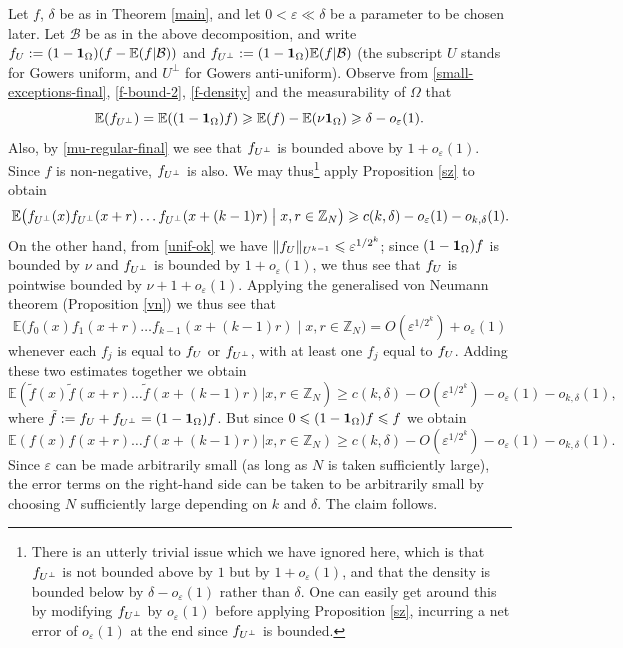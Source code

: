 \documentclass[12pt,a4paper,reqno]{amsart}
\numberwithin{equation}{section}
\theoremstyle{plain}
\theoremstyle{definition}
\renewcommand{\leq}{\leqslant}
\renewcommand{\geq}{\geqslant}
\def\funif{\ensuremath f_{U}}
\def\fanti{\ensuremath f_{U^\perp}}
\def\B{{\mathcal B}}
\def\E{{\mathbb E}}
\def\eps{{\varepsilon}}
\def\ni{\noindent}
\def\endproof{\hfill{\usebox{\proofbox}}}
\def\emph#1{{\it #1}}
\begin{document}
\ni\emph{Proof of Theorem \ref{main} assuming Proposition \ref{kvn-decomp}.}  Let $f$, $\delta$ be as in Theorem \ref{main}, and let $0 < \eps \ll \delta$ be a parameter to be chosen later.  Let $\B$ be as in the above decomposition, and write $\funif := (1-{\bf 1}_\Omega)(f-\E(f|\B))$ and
$\fanti := (1-{\bf 1}_\Omega)\E(f|\B)$ (the subscript $U$ stands for Gowers uniform, and $U^\perp$ for Gowers anti-uniform).  Observe from \eqref{small-exceptions-final}, \eqref{f-bound-2},
\eqref{f-density} and the measurability of $\Omega$ that
$$ \E( \fanti ) = \E( (1-{\bf 1}_\Omega) f) \geq \E(f) - \E( \nu {\bf 1}_\Omega ) \geq \delta - o_\eps(1).$$
Also, by \eqref{mu-regular-final} we see that $\fanti$ is bounded above by $1+o_{\eps}(1)$.  Since $f$ is non-negative, $\fanti$ is also.
We may thus\footnote{There is an utterly trivial issue which we have ignored here, which is that $\fanti$ is not bounded above by $1$ but by $1 + o_\eps(1)$, and that the density is bounded below by $\delta - o_\eps(1)$ rather than $\delta$. One can easily get around this by modifying $\fanti$ by $o_\eps(1)$ before applying Proposition \ref{sz}, incurring a net error of $o_\eps(1)$ at the end since $\fanti$ is bounded.} apply Proposition \ref{sz}  to obtain
\[
 \E\big( \fanti(x) \fanti(x+r) \ldots \fanti(x+(k-1)r) \; \big| \; x,r \in \mathbb{Z}_N \big) \geq c(k,\delta) -  o_{\eps}(1) - o_{k,\delta}(1).\]
On the other hand, from \eqref{unif-ok} we have $\|\funif \|_{U^{k-1}} \leq \eps^{1/2^k}$; since $(1-{\bf 1}_\Omega)f$ is bounded by $\nu$
and $\fanti$ is bounded by $1+o_{\eps}(1)$, we thus see that $\funif$ is pointwise bounded by $\nu+1+o_{\eps}(1)$.
Applying the generalised von Neumann theorem (Proposition \ref{vn}) we thus see that
 \[
 \E\big( f_0(x) f_1(x+r) \ldots f_{k-1}(x+(k-1)r) \; \big| \; x,r \in \mathbb{Z}_N \big) = O(\eps^{1/2^k}) + o_{\eps}(1)\]
whenever each $f_j$ is equal to $\funif$ or $\fanti$, with at least one $f_j$ equal to $\funif$.  Adding these two estimates together
we obtain
\[
 \E( \tilde f(x) \tilde f(x+r) \ldots \tilde f(x+(k-1)r) | x,r \in \mathbb{Z}_N ) \geq c(k,\delta) - O(\eps^{1/2^k}) - o_{\eps}(1) - o_{k,\delta}(1),\]
where $\tilde f := \funif + \fanti = (1-{\bf 1}_\Omega) f$.  But since $0 \leq (1-{\bf 1}_\Omega) f \leq f$ we obtain
$$
 \E( f(x) f(x+r) \ldots f(x+(k-1)r) | x,r \in \mathbb{Z}_N ) \geq c(k,\delta) - O(\eps^{1/2^k}) - o_{\eps}(1)- o_{k,\delta}(1).$$
Since $\eps$ can be made arbitrarily small (as long as $N$ is taken sufficiently large), the error terms on the right-hand side can be taken to
be arbitrarily small by choosing $N$ sufficiently large depending on $k$ and $\delta$.  The claim follows.
\endproof\vspace{11pt}
\end{document}
